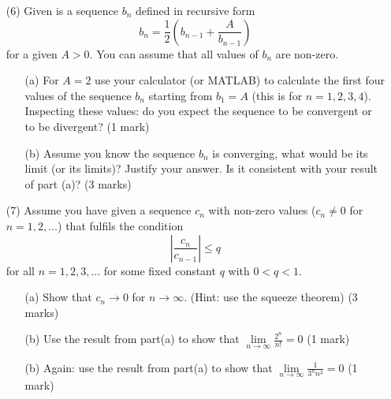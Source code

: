 \documentclass[12pt,english]{article}
\begin{document}
\begin{itemize}
\item[(6)] Given is a sequence $b_n$ defined in recursive form 
$$
b_n=\frac{1}{2}\left(b_{n-1}+\frac{A}{b_{n-1}}\right)
$$
for a given $A>0$. You can assume that all values of $b_n$ are non-zero.
\begin{itemize}
    \item[(a)] For $A=2$ use your calculator (or MATLAB) to calculate the first four values of the sequence $b_n$ starting from $b_1=A$ (this is for $n=1,2,3,4$). Inspecting these values: do you expect the sequence to be convergent or to be divergent?  \hfill{(1 mark)}
    \item[(b)] Assume you know the sequence $b_n$ is converging, what would be its limit (or its limits)? Justify your answer. Is it consistent with your result of part (a)? \hfill{(3 marks)}
\end{itemize}


\item[(7)] Assume you have given a sequence $c_n$
with non-zero values ($c_n \not =0$ for $n=1,2,\ldots$)
that fulfils the condition 
\begin{equation}
\left|\frac{c_n}{c_{n-1}}\right| \le q    
\end{equation}
for all $n=1,2,3,\ldots$ for some fixed constant $q$ with $0< q <1$.
\begin{itemize}
    \item[(a)] Show that $c_n \to 0$ for $n \to \infty$. (Hint: use the squeeze theorem) \hfill{(3 marks)}
    \item[(b)] Use the result from part(a) to show that
$\lim \limits_{n\rightarrow \infty} \frac{2^n}{n!} = 0$ \hfill{(1 mark)}
    \item[(b)] Again: use the result from part(a) to show that
$\lim \limits_{n\rightarrow \infty} \frac{1}{3^n n^3} = 0$ \hfill{(1 mark)}
\end{itemize}
\end{itemize}
\vspace{4.5cm}

\end{document}
